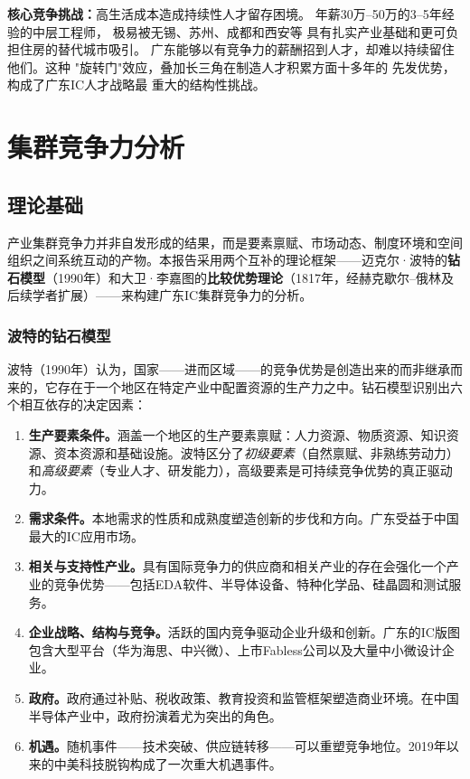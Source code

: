 \documentclass[12pt,a4paper]{article}
\begin{document}
\textbf{核心竞争挑战：}高生活成本造成持续性人才留存困境。
年薪30万--50万的3--5年经验的中层工程师，
极易被无锡、苏州、成都和西安等
具有扎实产业基础和更可负担住房的替代城市吸引。
广东能够以有竞争力的薪酬招到人才，却难以持续留住他们。这种
"旋转门"效应，叠加长三角在制造人才积累方面十多年的
先发优势，构成了广东IC人才战略最
重大的结构性挑战。

\section{集群竞争力分析}
\label{sec:cluster}

\subsection{理论基础}
\label{sec:theory}

产业集群竞争力并非自发形成的结果，而是要素禀赋、市场动态、制度环境和空间组织之间系统互动的产物。本报告采用两个互补的理论框架——迈克尔·波特的\textbf{钻石模型}（1990年）和大卫·李嘉图的\textbf{比较优势理论}（1817年，经赫克歇尔--俄林及后续学者扩展）——来构建广东IC集群竞争力的分析。

\subsubsection{波特的钻石模型}

波特（1990年）认为，国家——进而区域——的竞争优势是创造出来的而非继承而来的，它存在于一个地区在特定产业中配置资源的生产力之中。钻石模型识别出六个相互依存的决定因素：

\begin{enumerate}[label=(\arabic*)]
    \item \textbf{生产要素条件。}涵盖一个地区的生产要素禀赋：人力资源、物质资源、知识资源、资本资源和基础设施。波特区分了\textit{初级要素}（自然禀赋、非熟练劳动力）和\textit{高级要素}（专业人才、研发能力），高级要素是可持续竞争优势的真正驱动力。
    \item \textbf{需求条件。}本地需求的性质和成熟度塑造创新的步伐和方向。广东受益于中国最大的IC应用市场。
    \item \textbf{相关与支持性产业。}具有国际竞争力的供应商和相关产业的存在会强化一个产业的竞争优势——包括EDA软件、半导体设备、特种化学品、硅晶圆和测试服务。
    \item \textbf{企业战略、结构与竞争。}活跃的国内竞争驱动企业升级和创新。广东的IC版图包含大型平台（华为海思、中兴微）、上市Fabless公司以及大量中小微设计企业。
    \item \textbf{政府。}政府通过补贴、税收政策、教育投资和监管框架塑造商业环境。在中国半导体产业中，政府扮演着尤为突出的角色。
    \item \textbf{机遇。}随机事件——技术突破、供应链转移——可以重塑竞争地位。2019年以来的中美科技脱钩构成了一次重大机遇事件。
\end{enumerate}
\end{document}
